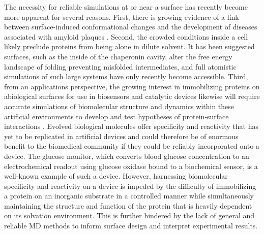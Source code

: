 The necessity for reliable simulations at or near a surface has recently become more apparent for several reasons. 
First, there is growing evidence of a link between surface-induced conformational changes and the development of diseases associated with amyloid plaques \cite{Makin2005, Rambaran2008, Lednev2014}.
Second, the crowded conditions inside a cell likely preclude proteins from being alone in dilute solvent. 
It has been suggested surfaces, such as the inside of the chaperonin cavity, alter the free energy landscape of folding preventing misfolded intermediates\cite{Bhattacharya2012}, and full atomistic simulations of such large systems have only recently become accessible\cite{Piana2018}. 
Third, from an applications perspective, the growing interest in immobilizing proteins on abiological surfaces for use in biosensors and catalytic devices likewise will require accurate simulations of biomolecular structure and dynamics within these artificial environments to develop and test hypotheses of protein-surface interactions \cite{Sarikaya2003, Barton2004, Noll2011, Renner2016}.
Evolved biological molecules offer specificity and reactivity that has yet to be replicated in artificial devices and could therefore be of enormous benefit to the biomedical community if they could be reliably incorporated onto a device. 
The glucose monitor, which converts blood glucose concentration to an electrochemical readout using glucose oxidase bound to a biochemical sensor, is a well-known example of such a device\cite{Wang2008}. 
However, harnessing biomolecular specificity and reactivity on a device is impeded by the difficulty of immobilizing a protein on an inorganic substrate in a controlled manner while simultaneously maintaining the structure and function of the protein that is heavily dependent on its solvation environment. 
This is further hindered by the lack of general and reliable MD methods to inform surface design and interpret experimental results. 

